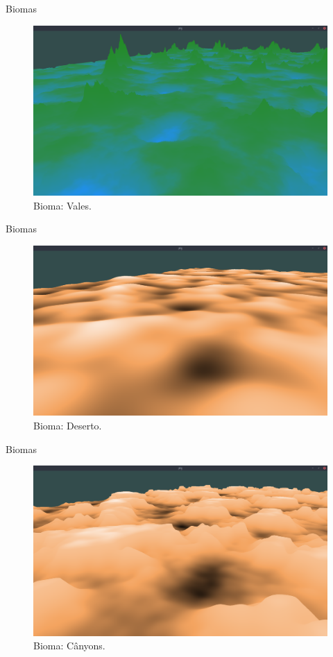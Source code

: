 \begin{frame}{Biomas}
    \begin{figure}[H]
        \centering
        \includegraphics[width=.9\textwidth]{img/biomas/bssValley.png}
        \caption{Bioma: Vales.}
        \label{fig:img_biomas_bssValley}
    \end{figure}
    
    
\end{frame}

\begin{frame}{Biomas}
    \begin{figure}[H]
        \centering
        \includegraphics[width=.9\textwidth]{img/biomas/bssDesert.png}
        \caption{Bioma: Deserto.}
        \label{fig:img_biomas_bssDesert}
    \end{figure}
    
    
\end{frame}

\begin{frame}{Biomas}
    \begin{figure}[H]
        \centering
        \includegraphics[width=.9\textwidth]{img/biomas/bssCanyons.png}
        \caption{Bioma: Cânyons.}
        \label{fig:img_biomas_bssCanyons}
    \end{figure}
    
    
\end{frame}